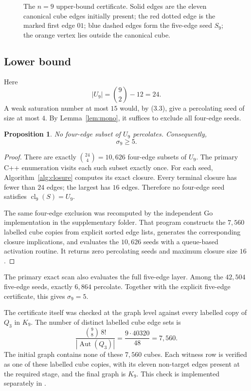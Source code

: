 \documentclass[11pt]{article}
\numberwithin{equation}{section}
\newtheorem{proposition}[theorem]{Proposition}
\newcommand{\cl}{\operatorname{cl}}
\newcommand{\Aut}{\operatorname{Aut}}
\begin{document}
\begin{figure}[t]
\centering
\resizebox{0.72\linewidth}{!}{}
\caption{The $n=9$ upper-bound certificate. Solid edges are the eleven canonical cube edges initially present; the red dotted edge is the marked first edge $01$; blue dashed edges form the five-edge seed $S_9$; the orange vertex lies outside the canonical cube.}
\label{fig:n9seed}
\end{figure}

\subsection{Lower bound}
Here
\[
|U_9|=\binom92-12=24.
\]
A weak saturation number at most $15$ would, by (3.3), give a percolating seed of size at most $4$. By Lemma~\ref{lem:mono}, it suffices to exclude all four-edge seeds.

\begin{proposition}\label{prop:n9lower}
No four-edge subset of $U_9$ percolates. Consequently,
\[
\sigma_9\ge5.
\]
\end{proposition}

\begin{proof}
There are exactly $\binom{24}{4}=10,626$ four-edge subsets of $U_9$. The primary C++ enumeration visits each such subset exactly once. For each seed, Algorithm~\ref{alg:closure} computes its exact closure. Every terminal closure has fewer than $24$ edges; the largest has $16$ edges. Therefore no four-edge seed satisfies $\cl_9(S)=U_9$.

The same four-edge exclusion was recomputed by the independent Go implementation in the supplementary folder. That program constructs the $7,560$ labelled cube copies from explicit sorted edge lists, generates the corresponding closure implications, and evaluates the $10,626$ seeds with a queue-based activation routine. It returns zero percolating seeds and maximum closure size $16$.
\end{proof}

The primary exact scan also evaluates the full five-edge layer. Among the $42,504$ five-edge seeds, exactly $6,864$ percolate. Together with the explicit five-edge certificate, this gives $\sigma_9=5$.

The certificate itself was checked at the graph level against every labelled copy of $Q_3$ in $K_9$. The number of distinct labelled cube edge sets is
\[
\frac{\binom98\,8!}{|\Aut(Q_3)|}=\frac{9\cdot40320}{48}=7,560.
\tag{4.6}
\]
The initial graph contains none of these $7,560$ cubes. Each witness row is verified as one of these labelled cube copies, with its eleven non-target edges present at the required stage, and the final graph is $K_9$. This check is implemented separately in .
\end{document}
